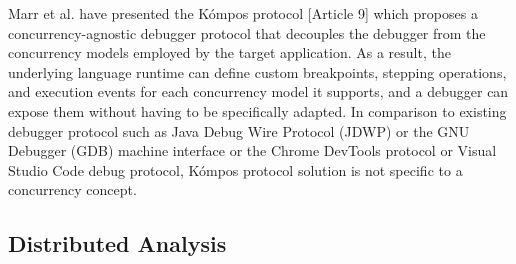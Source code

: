 Marr et al. have presented the Kómpos protocol [Article 9] which proposes a concurrency-agnostic debugger protocol that decouples the debugger from the concurrency models employed by the target application. As a result, the underlying language runtime can define custom breakpoints, stepping operations, and execution events for each concurrency model it supports, and a debugger can expose them without having to be specifically adapted. In comparison to existing debugger protocol such as Java Debug Wire Protocol (JDWP) or the GNU Debugger (GDB) machine interface or the Chrome DevTools protocol or Visual Studio Code debug protocol, Kómpos protocol solution is not specific to a concurrency concept.








\subsection{Distributed Analysis}

